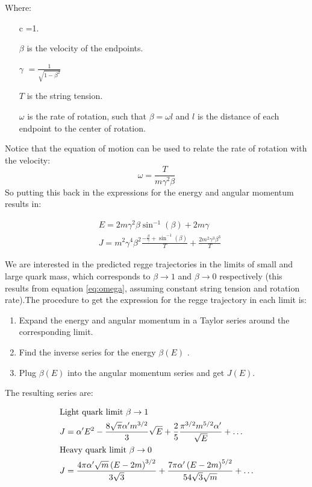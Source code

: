 \documentclass[11pt,a4paper]{article}
\begin{document}
Where:
\begin{itemize}
\item[c]=1.
\item[$\beta$] is the velocity of the endpoints.
\item[$\gamma$]$=\frac{1}{\sqrt{1-\beta^2}}$
\item[$T$] is the string tension.
\item[$\omega$] is the rate of rotation, such that $\beta=\omega l$ and $l$ is the distance of each endpoint to the center of rotation.
\end{itemize}

Notice that the equation of motion can be used to relate the rate of rotation with the velocity:
\begin{equation}
\label{eq:omega}
\omega=\frac{T}{m\gamma^2\beta}
\end{equation}
So putting this back in the expressions for the energy and angular momentum results in:

\begin{subequations}
\begin{align}
&E=2m\gamma^2\beta\sin^{-1}\left(\beta\right)+2m\gamma\\
&J=m^2\gamma^4\beta^2 \frac{-\frac{\beta}{\gamma}+\sin^{-1}\left(\beta\right)}{T}+\frac{2m^2\gamma^3\beta^{3}}{T}
\end{align}
\end{subequations}

We are interested in the predicted regge trajectories in the limits of small and large quark mass, which corresponds to $\beta\rightarrow1$ and $\beta\rightarrow0$ respectively (this results from equation \ref{eq:omega}, assuming constant string tension and rotation rate).The procedure to get the expression for the regge trajectory in each limit  is:
\begin{enumerate}
\item Expand the energy and angular momentum in a Taylor series around the corresponding limit.
\item Find the inverse series for the energy $\beta\left(E\right)$ \cite{WolframSeriesReversion}.
\item Plug $\beta\left(E\right)$ into the angular momentum series and get $J\left(E\right)$.
\end{enumerate}

The resulting series are:

\begin{subequations}  
\begin{align}
&\text{Light quark limit }\beta\rightarrow1\notag\\
&J=\alpha' E^2-\frac{8 \sqrt{\pi } \alpha' m^{3/2}}{3}\sqrt{E}+\frac{2}{5}\frac{\pi^{3/2}m^{5/2}\alpha'}{\sqrt{E}}+\hdots \\
&\text{Heavy quark limit }\beta\rightarrow0\notag\\
&J=\frac{4\pi\alpha'\sqrt{m} \left(E-2 m\right)^{3/2}}{3\sqrt{3}}+\frac{7\pi\alpha'  \left(E-2m\right)^{5/2}}{54\sqrt{3}\sqrt{m}}+\hdots
\end{align}
\end{subequations}
\end{document}
